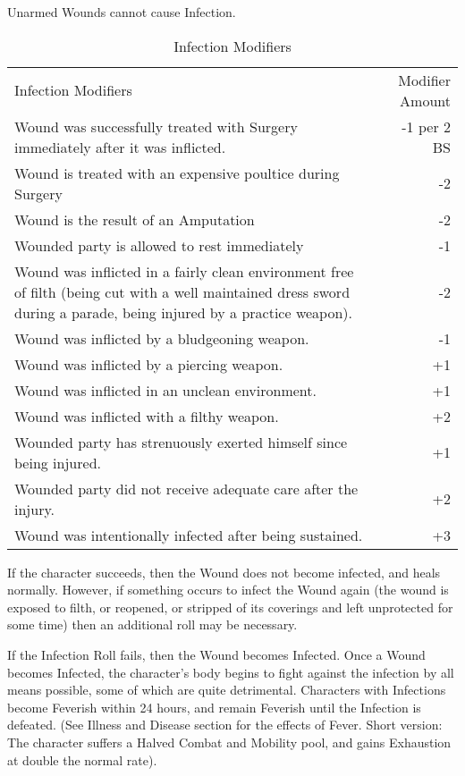 \documentclass[oneside,11pt,english]{book}
\begin{document}
Unarmed Wounds cannot cause Infection.

\begin{table} %
	\centering
	\caption{Infection Modifiers}
	\label{tab:Infection Modifiers}
	\begin{tabu} spread 0pt {Xr}
    Infection Modifiers &Modifier Amount\\
    Wound was successfully treated with Surgery immediately after it was inflicted. &-1 per 2 BS\\
    Wound is treated with an expensive poultice during Surgery &-2\\
    Wound is the result of an Amputation &-2\\
    Wounded party is allowed to rest immediately &-1\\
    Wound was inflicted in a fairly clean environment free of filth (being cut with a well maintained dress sword during a parade, being injured by a practice weapon). &-2\\
    Wound was inflicted by a bludgeoning weapon. &-1\\
    Wound was inflicted by a piercing weapon. &+1\\
    Wound was inflicted in an unclean environment. &+1\\
    Wound was inflicted with a filthy weapon. &+2\\
    Wounded party has strenuously exerted himself since being injured. &+1\\
    Wounded party did not receive adequate care after the injury. &+2\\
    Wound was intentionally infected after being sustained. &+3\\
	\end{tabu}
\end{table}
If the character succeeds, then the Wound does not become infected, and heals normally. However, if 
something occurs to infect the Wound again (the wound is exposed to filth, or reopened, or stripped of its 
coverings and left unprotected for some time) then an additional roll may be necessary. 

If the Infection Roll fails, then the Wound becomes Infected. Once a Wound becomes Infected, the 
character’s body begins to fight against the infection by all means possible, some of which are quite 
detrimental. Characters with Infections become Feverish within 24 hours, and remain Feverish until the 
Infection is defeated. (See Illness and Disease section for the effects of Fever. Short version: The 
character suffers a Halved Combat and Mobility pool, and gains Exhaustion at double the normal rate). 
\end{document}
